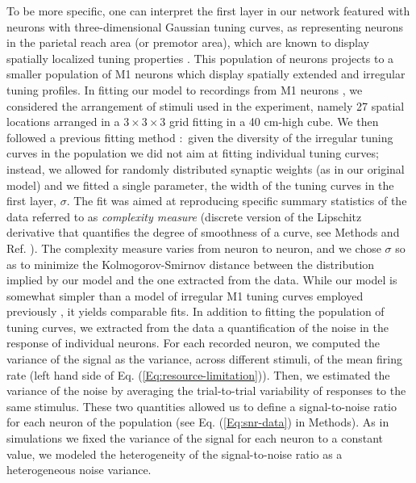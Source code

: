 \documentclass[a4paper]{article}%
\begin{document}
To be more specific, one can interpret the first layer in our network featured
with neurons with three-dimensional Gaussian tuning curves, as representing
neurons in the parietal reach area (or premotor area), which are known to
display spatially localized tuning properties
\cite{Andersen1985EncodingNeurons}. This population of neurons projects to a
smaller population of M1 neurons which display spatially extended and
irregular tuning profiles. In fitting our model to recordings from M1 neurons
\cite{Lalazar2016TuningConnectivity}, we considered the arrangement of stimuli
used in the experiment, namely 27 spatial locations arranged in a
$3\times3\times3$ grid fitting in a 40 cm-high cube. We then followed a
previous fitting method
\cite{Lalazar2016TuningConnectivity,Arakaki2019InferringCurvesb}:\ given the
diversity of the irregular tuning curves in the population we did not aim at
fitting individual tuning curves; instead, we allowed for randomly distributed
synaptic weights (as in our original model) and we fitted a single parameter,
the width of the tuning curves in the first layer, $\sigma$. The fit was aimed
at reproducing specific summary statistics of the data referred to as
\textit{complexity measure} (discrete version of the Lipschitz derivative that
quantifies the degree of smoothness of a curve, see Methods and Ref.
\cite{Lalazar2016TuningConnectivity}). The complexity measure varies from
neuron to neuron, and we chose $\sigma$ so as to minimize the
Kolmogorov-Smirnov distance between the distribution implied by our model and
the one extracted from the data. While our model is somewhat simpler than a
model of irregular M1 tuning curves employed previously
\cite{Lalazar2016TuningConnectivity}, it yields comparable fits. In addition
to fitting the population of tuning curves, we extracted from the data a
quantification of the noise in the response of individual neurons. For each
recorded neuron, we computed the variance of the signal as the variance,
across different stimuli, of the mean firing rate (left hand side of Eq.
(\ref{Eq:resource-limitation})). Then, we estimated the variance of the noise
by averaging the trial-to-trial variability of responses to the same stimulus.
These two quantities allowed us to define a signal-to-noise ratio for each
neuron of the population (see Eq. (\ref{Eq:snr-data}) in Methods). As in
simulations we fixed the variance of the signal for each neuron to a constant
value, we modeled the heterogeneity of the signal-to-noise ratio as a
heterogeneous noise variance.
\end{document}
